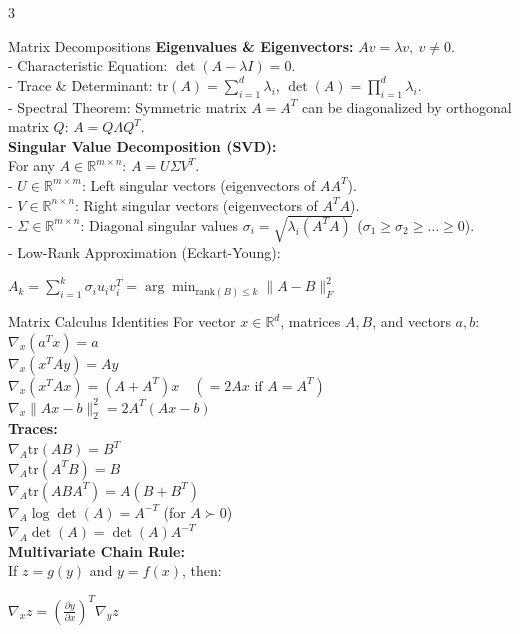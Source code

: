 \documentclass[10pt]{article}
\begin{document}
\begin{multicols*}{3}
\begin{laBox}{Matrix Decompositions}
\textbf{Eigenvalues \& Eigenvectors:} $A v = \lambda v, \ v \neq 0$. \\
- Characteristic Equation: $\det(A - \lambda I) = 0$. \\
- Trace \& Determinant: $\text{tr}(A) = \sum_{i=1}^d \lambda_i$, $\det(A) = \prod_{i=1}^d \lambda_i$. \\
- Spectral Theorem: Symmetric matrix $A = A^T$ can be diagonalized by orthogonal matrix $Q$: $A = Q \Lambda Q^T$. \\
\textbf{Singular Value Decomposition (SVD):} \\
For any $A \in \mathbb{R}^{m \times n}$: $A = U \Sigma V^T$. \\
- $U \in \mathbb{R}^{m \times m}$: Left singular vectors (eigenvectors of $AA^T$). \\
- $V \in \mathbb{R}^{n \times n}$: Right singular vectors (eigenvectors of $A^T A$). \\
- $\Sigma \in \mathbb{R}^{m \times n}$: Diagonal singular values $\sigma_i = \sqrt{\lambda_i(A^T A)}$ ($\sigma_1 \ge \sigma_2 \ge \dots \ge 0$). \\
- Low-Rank Approximation (Eckart-Young): \\
  {\centering $A_k = \sum_{i=1}^k \sigma_i u_i v_i^T = \arg\min_{\text{rank}(B) \le k} \|A - B\|_F^2$\par}
\end{laBox}

\begin{calcBox}{Matrix Calculus Identities}
For vector $x \in \mathbb{R}^d$, matrices $A, B$, and vectors $a, b$: \\
$\nabla_x (a^T x) = a$ \\
$\nabla_x (x^T A y) = A y$ \\
$\nabla_x (x^T A x) = (A + A^T)x \quad (= 2Ax \text{ if } A = A^T)$ \\
$\nabla_x \|Ax - b\|_2^2 = 2A^T(Ax - b)$ \\
\textbf{Traces:} \\
$\nabla_A \text{tr}(A B) = B^T$ \\
$\nabla_A \text{tr}(A^T B) = B$ \\
$\nabla_A \text{tr}(A B A^T) = A(B + B^T)$ \\
$\nabla_A \log \det(A) = A^{-T}$ (for $A \succ 0$) \\
$\nabla_A \det(A) = \det(A) A^{-T}$ \\
\textbf{Multivariate Chain Rule:} \\
If $z = g(y)$ and $y = f(x)$, then: \\
{\centering $\nabla_x z = \left(\frac{\partial y}{\partial x}\right)^T \nabla_y z$\par}
\end{calcBox}


\end{multicols*}
\end{document}
